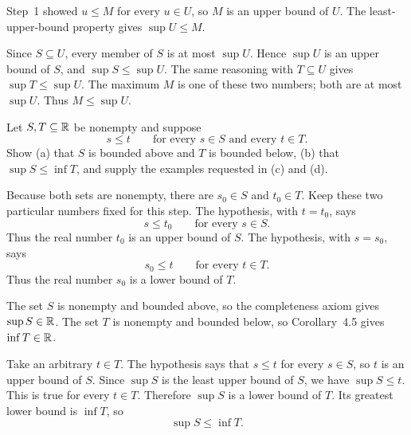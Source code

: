 Step~1 showed $u\le M$ for every $u\in U$, so $M$ is an upper bound
of $U$. The least-upper-bound property gives $\sup U\le M$.

Since $S\subseteq U$, every member of $S$ is at most $\sup U$.
Hence $\sup U$ is an upper bound of $S$, and $\sup S\le\sup U$.
The same reasoning with $T\subseteq U$ gives $\sup T\le\sup U$.
The maximum $M$ is one of these two numbers; both are at most
$\sup U$. Thus $M\le\sup U$.



\goal Let $S,T\subseteq\mathbb{R}$ be nonempty and suppose
\[
 s\le t\qquad\text{for every }s\in S\text{ and every }t\in T.
\]
Show (a) that $S$ is bounded above and $T$ is bounded below, (b) that
$\sup S\le\inf T$, and supply the examples requested in (c) and (d).

Because both sets are nonempty, there are $s_0\in S$ and $t_0\in T$.
Keep these two particular numbers fixed for this step.
The hypothesis, with $t=t_0$, says
\[
 s\le t_0\qquad\text{for every }s\in S.
\]
Thus the real number $t_0$ is an upper bound of $S$.
The hypothesis, with $s=s_0$, says
\[
 s_0\le t\qquad\text{for every }t\in T.
\]
Thus the real number $s_0$ is a lower bound of $T$.


The set $S$ is nonempty and bounded above, so the completeness axiom
gives $\sup S\in\mathbb{R}$. The set $T$ is nonempty and bounded below, so
Corollary~4.5 gives $\inf T\in\mathbb{R}$.

Take an arbitrary $t\in T$. The hypothesis says that $s\le t$ for
every $s\in S$, so $t$ is an upper bound of $S$. Since $\sup S$ is
the least upper bound of $S$, we have $\sup S\le t$.
This is true for every $t\in T$. Therefore $\sup S$ is a lower bound
of $T$. Its greatest lower bound is $\inf T$, so
\[
 \sup S\le\inf T.
\]

